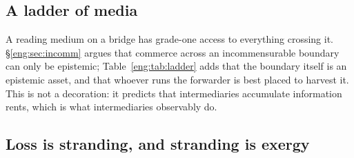 \subsection{A ladder of media}\label{eng:S5.2}

\begin{table}[t]
\centering\small
{}
\caption{Media classified by behaviour. The engine is the top rung, so the
fourth access profile of Table~\ref{eng:tab:profiles} is not a separate kind of
thing but the most behaviourally elaborate interposition.}
\label{eng:tab:ladder}
\end{table}

\begin{remark}\label{eng:intermediary-learns-most}
A reading medium on a bridge has grade-one access to everything crossing
it. \S\ref{eng:sec:incomm} argues that commerce across an incommensurable
boundary can only be epistemic; Table~\ref{eng:tab:ladder} adds that the
boundary itself is an epistemic asset, and that whoever runs the forwarder
is best placed to harvest it. This is not a decoration: it predicts that
intermediaries accumulate information rents, which is what intermediaries
observably do.
\end{remark}

\subsection{Loss is stranding, and stranding is exergy}\label{eng:S5.3}

